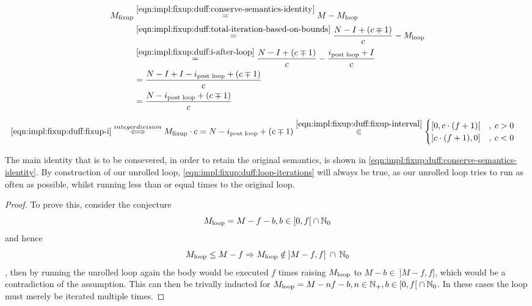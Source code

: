 \begin{equation}\label{eqn:impl:fixup:duff:fixup-i}
    \begin{aligned}
        M_{\text{fixup}} & \overset{\ref{eqn:impl:fixup:duff:conserve-semantics-identity}}{=} M - M_{\text{loop}} \\
        & \overset{\ref{eqn:impl:fixup:duff:total-iteration-based-on-bounds}}{=}
            \frac{N - I + (c \mp 1)}{c} - M_{\text{loop}} \\
        & \overset{\ref{eqn:impl:fixup:duff:i-after-loop}}{=}
        \frac{N - I + (c \mp 1)}{c} - \frac{i_\text{post loop} + I}{c} \\
        &= \frac{N - I + I - i_\text{post loop} + (c \mp 1)}{c}\\
        &= \frac{N - i_\text{post loop} + (c \mp 1)}{c}
    \end{aligned}
\end{equation}

\begin{equation}\label{eqn:impl:fixup:duff:fixup-i-mult}
    \begin{aligned}
        \ref{eqn:impl:fixup:duff:fixup-i} &\overset{integer division}{\Longleftrightarrow} M_{\text{fixup}} \cdot c = N - i_\text{post loop} + (c \mp 1) \overset{\ref{eqn:impl:fixup:duff:fixup-interval}}{\in}  \begin{cases} \lbrack 0, c \cdot (f + 1) \lbrack &, \medspace c > 0\\ \rbrack c \cdot (f + 1), 0 \rbrack &, \medspace c < 0 \end{cases} 
    \end{aligned}
\end{equation}

The main identity that is to be consevered, in order to retain the original semantics, is shown in \cref{eqn:impl:fixup:duff:conserve-semantics-identity}.
By construction of our unrolled loop, \cref{eqn:impl:fixup:duff:loop-iterations} will always be true, as our unrolled loop tries to run as often as possible, whilst running less than or equal times to the original loop.

\begin{proof}\label{proof:impl:fixup:duff:loop-iterations}
    To prove this, consider the conjecture
    \[M_{\text{loop}} = M - f - b,  b \in \lbrack 0, f \lbrack \medspace \cap \medspace \mathbb{N}_0\]
    and hence
    \[M_{\text{loop}} \leq M - f \Rightarrow M_{\text{loop}} \notin \medspace \rbrack M-f,f \rbrack \medspace \cap \medspace \mathbb{N}_0 \]
    , then by running the unrolled loop again the body would be executed $f$ times raising $M_{\text{loop}}$ to $M - b \in \medspace \rbrack M-f,f \rbrack$, which would be a contradiction of the assumption.
    This can then be trivally inducted for $M_{\text{loop}} = M - nf - b, n \in \mathbb{N}_{+}, b \in \lbrack 0, f \lbrack \medspace \cap \medspace \mathbb{N}_0$.
    In these cases the loop must merely be iterated multiple times.
\end{proof}

